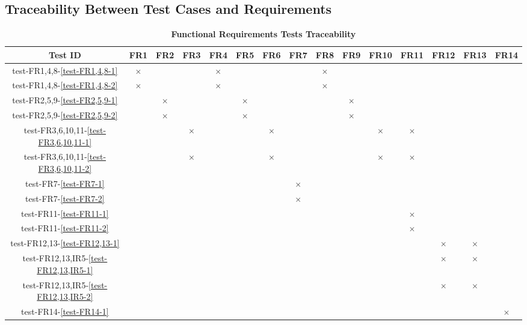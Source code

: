 \documentclass[12pt, titlepage]{article}
\begin{document}
\begin{landscape}
\subsection{Traceability Between Test Cases and Requirements} \label{section:4.4}

\begin{table}[H]
  \centering
  \begin{tabular}{|c|c|c|c|c|c|c|c|c|c|c|c|c|c|c|}
  \hline
   Test ID & FR1 & FR2 & FR3 & FR4 & FR5 & FR6 & FR7 & FR8 & FR9 & FR10 & FR11 & FR12 & FR13 & FR14\\
  \hline
  test-FR1,4,8-\ref{test-FR1,4,8-1} & $\times$ & & & $\times$ & & & & $\times$ & & & & & & \\
  \hline
  test-FR1,4,8-\ref{test-FR1,4,8-2} & $\times$ & & & $\times$ & & & & $\times$ & & & & & & \\
  \hline
  test-FR2,5,9-\ref{test-FR2,5,9-1} & & $\times$ & & & $\times$ & & & & $\times$ & & & & & \\
  \hline
  test-FR2,5,9-\ref{test-FR2,5,9-2} & & $\times$ & & & $\times$ & & & & $\times$ & & & & & \\
  \hline
  test-FR3,6,10,11-\ref{test-FR3,6,10,11-1} & & & $\times$ & & & $\times$ & & & & $\times$ & $\times$ & & & \\
  \hline
  test-FR3,6,10,11-\ref{test-FR3,6,10,11-2} & & & $\times$ & & & $\times$ & & & & $\times$ & $\times$ & & & \\
  \hline
  test-FR7-\ref{test-FR7-1} & & & & & & & $\times$ & & & & & & & \\
  \hline
  test-FR7-\ref{test-FR7-2} & & & & & & & $\times$ & & & & & & & \\
  \hline
  test-FR11-\ref{test-FR11-1} & & & & & & & & & & & $\times$ & & & \\
  \hline
  test-FR11-\ref{test-FR11-2} & & & & & & & & & & & $\times$ & & & \\
  \hline
  test-FR12,13-\ref{test-FR12,13-1} & & & & & & & & & & & & $\times$ & $\times$ & \\
  \hline
  test-FR12,13,IR5-\ref{test-FR12,13,IR5-1} & & & & & & & & & & & & $\times$ & $\times$ & \\
  \hline
  test-FR12,13,IR5-\ref{test-FR12,13,IR5-2} & & & & & & & & & & & & $\times$ & $\times$ & \\
  \hline
  test-FR14-\ref{test-FR14-1} & & & & & & & & & & & & & & $\times$ \\
  \hline
\end{tabular}
\caption{\bf Functional Requirements Tests Traceability} \label{tab:fr-test-traceability}
\end{table}



\end{landscape}
\end{document}
